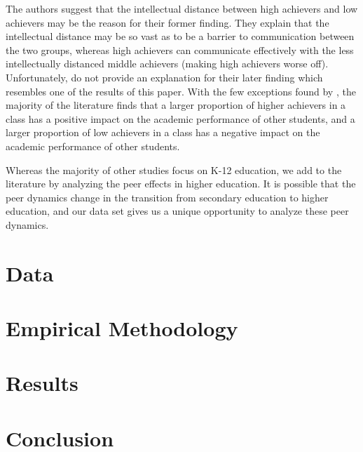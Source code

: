 \documentclass[12pt,letterpaper,english,fleqn,titlepage]{article}
\newcommand{\sectlabel}[1]{section~\ref{#1} (\nameref{#1})}
\begin{document}
The authors suggest that the intellectual distance between high achievers and low achievers may be the reason for their former finding.
They explain that the intellectual distance may be so vast as to be a barrier to communication between the two groups, whereas high achievers can communicate effectively with the less intellectually distanced middle achievers (making high achievers worse off). 
Unfortunately, \citeauthor{burke2013classroom} do not provide an explanation for their later finding which resembles one of the results of this paper.
With the few exceptions found by \citet{burke2013classroom}, the majority of the literature finds that a larger proportion of higher achievers in a class has a positive impact on the academic performance of other students, and a larger proportion of low achievers in a class has a negative impact on the academic performance of other students.%

Whereas the majority of other studies focus on K-12 education, we add to the literature by analyzing the peer effects in higher education. 
It is possible that the peer dynamics change in the transition from secondary education to higher education, and our data set gives us a unique opportunity to analyze these peer dynamics.

\section{Data}\label{data}



\section{Empirical Methodology}\label{methods}



\section{Results}\label{results}



\section{Conclusion}\label{conclusion}
\end{document}
